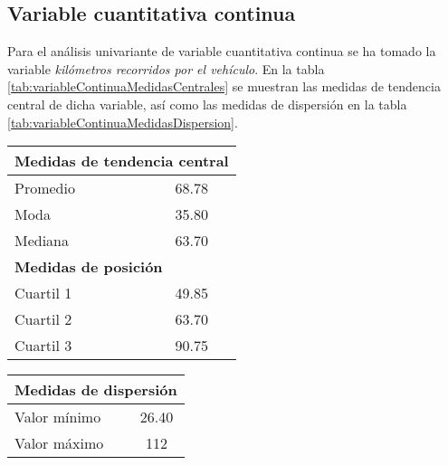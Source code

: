 \subsection*{Variable cuantitativa continua}
Para el análisis univariante de variable cuantitativa continua se ha tomado la variable \emph{kilómetros recorridos por el vehículo}. En la tabla \ref{tab:variableContinuaMedidasCentrales} se muestran las medidas de tendencia central de dicha variable, así como las medidas de dispersión en la tabla \ref{tab:variableContinuaMedidasDispersion}.\par
\vspace{2em}
\begin{footnotesize}
    \begin{minipage}[!ht][9cm][b]{0.45\textwidth}
        \centering
        \begin{tabular}{lc}
            \toprule
            \multicolumn{2}{l}{\textbf{Medidas de tendencia central}} \\
            \bottomrule
            Promedio & 68.78\\
            \midrule
            Moda & 35.80\\
            \midrule
            Mediana & 63.70\\
            \bottomrule
            \toprule
            \multicolumn{2}{l}{\textbf{Medidas de posición}} \\
            \bottomrule
            Cuartil 1 & 49.85 \\
            \midrule
            Cuartil 2 & 63.70 \\
            \midrule
            Cuartil 3 & 90.75 \\
            \bottomrule
        \end{tabular}
        \label{tab:variableContinuaMedidasCentrales}
    \end{minipage}
    \begin{minipage}[!ht][9cm][b]{0.5\textwidth}
        \centering
        \begin{tabular}{lc}
            \toprule
            \multicolumn{2}{l}{\textbf{Medidas de dispersión}} \\
            \bottomrule
            \toprule
            Valor mínimo & 26.40 \\
            \midrule
            Valor máximo & 112 \\

\end{tabular}
\end{minipage}
\end{footnotesize}
